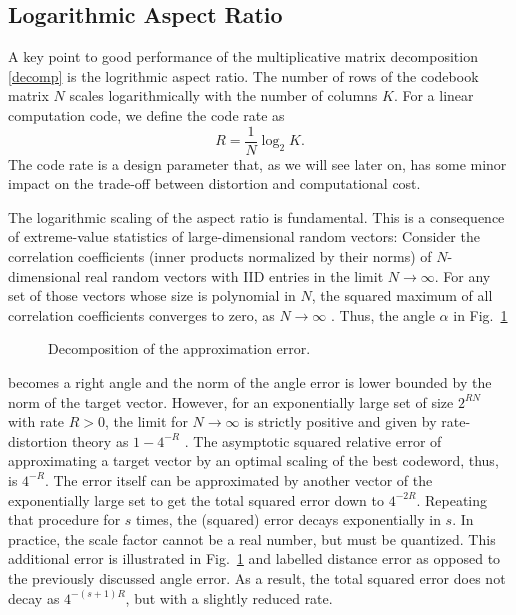 \documentclass[twocolumn]{IEEEtran}
\begin{document}
\subsection{Logarithmic Aspect Ratio}
\label{logasprat}
A key point to good performance of the multiplicative matrix decomposition \eqref{decomp} is the logrithmic aspect ratio. The number of rows of the codebook matrix $N$ scales logarithmically with the number of columns $K$. For a linear computation code, we define the code rate as 
\begin{equation}
R = \frac 1N \log_2 K.
\end{equation}
The code rate is a design parameter that, as we will see later on, has some minor impact on the trade-off between distortion and computational cost.

The logarithmic scaling of the aspect ratio is fundamental.
This is a consequence of extreme-value statistics of large-dimensional random vectors: Consider the correlation coefficients (inner products normalized by their norms) of $N$-dimensional real random vectors with IID entries in the limit $N\to\infty$. For any set of those vectors whose size is polynomial in $N$, the squared maximum of all correlation coefficients converges to zero, as $N\to\infty$ \cite{jiang:04}. Thus, the angle $\alpha$ in Fig.~\ref{pic} 
\begin{figure}
\centerline{
}
\caption{\label{pic} Decomposition of the approximation error.}
\end{figure}
becomes a right angle and the norm of the angle error is lower bounded by the norm of the target vector. However, for an exponentially large set of size $2^{RN}$ with rate $R>0$, the limit for $N\to\infty$ is strictly positive and given by rate-distortion theory as $1-4^{-R}$ \cite{berger:71}. The asymptotic squared relative error of approximating a target vector by an optimal scaling of the best codeword, thus, is $4^{-R}$. The error itself can be approximated by another vector of the exponentially large set to get the total squared error down to $4^{-2R}$. Repeating that procedure for $s$ times, the (squared) error decays exponentially in $s$. In practice, the scale factor  cannot be a real number, but must be quantized. This additional error is illustrated in Fig.~\ref{pic} and labelled distance error as opposed to the previously discussed angle error. As a result, the total squared error does not decay as $4^{-(s+1) R}$, but with a slightly reduced rate.
\end{document}
